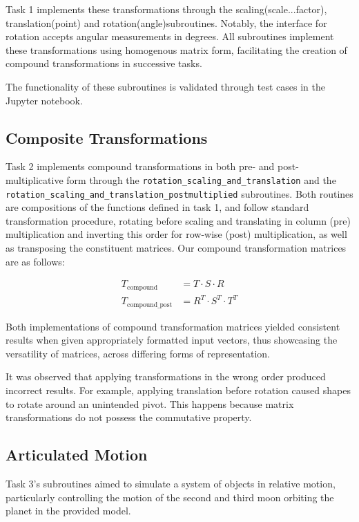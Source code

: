 \documentclass[10pt,a4paper]{article}
\begin{document}
Task 1 implements these transformations through the scaling(scale...factor), translation(point) and rotation(angle)subroutines. Notably, the interface for rotation accepts angular measurements in degrees. All subroutines implement these transformations using homogenous matrix form, facilitating the creation of compound transformations in successive tasks. 

The functionality of these subroutines is validated through test cases in the Jupyter notebook.


\subsection{Composite Transformations}

Task 2 implements compound transformations in both pre- and post- multiplicative form through the \texttt{rotation\_scaling\_and\_translation} and the \\ \texttt{rotation\_scaling\_and\_translation\_postmultiplied} subroutines. Both routines are compositions of the functions defined in task 1, and follow standard transformation procedure, rotating before scaling and translating in column (pre) multiplication and inverting this order for row-wise (post) multiplication, as well as transposing the constituent matrices. Our compound transformation matrices are as follows:

\begin{align}
T_{\text{compound}} &= T \cdot S \cdot R \\
T_{\text{compound\_post}} &= R^T \cdot S^T \cdot T^T
\end{align}

Both implementations of compound transformation matrices yielded consistent results when given appropriately formatted input vectors, thus showcasing the versatility of matrices, across differing forms of representation. 

It was observed that applying transformations in the wrong order produced incorrect results. For example, applying translation before rotation caused shapes to rotate around an unintended pivot. This happens because matrix transformations do not possess the commutative property. 



\subsection{Articulated Motion}

Task 3’s subroutines aimed to simulate a system of objects in relative motion, particularly controlling the motion of the second and third moon orbiting the planet in the provided model. 
\end{document}
